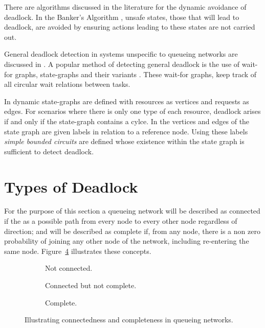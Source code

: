 \documentclass{article}
\begin{document}
There are algorithms discussed in the literature for the dynamic avoidance of deadlock.
In the Banker's Algorithm \cite{dijkstra82, kawadkaretal14}, unsafe states, those that will lead to deadlock, are avoided by ensuring actions leading to these states are not carried out.

General deadlock detection in systems unspecific to queueing networks are discussed in \cite{coffmanelphick71}.
A popular method of detecting general deadlock is the use of wait-for graphs, state-graphs and their variants \cite{cheng90, elmagarmid86, coffmanelphick71, choetal95}.
These wait-for graphs, keep track of all circular wait relations between tasks.

In \cite{coffmanelphick71} dynamic state-graphs are defined with resources as vertices and requests as edges.
For scenarios where there is only one type of each resource, deadlock arises if and only if the state-graph contains a cylce.
In \cite{choetal95} the vertices and edges of the state graph are given labels in relation to a reference node.
Using these labels \textit{simple bounded circuits} are defined whose existence within the state graph is sufficient to detect deadlock.

\section{Types of Deadlock}\label{sec:typesofdeadlock}
For the purpose of this section a queueing network will be described as connected if the as a possible path from every node to every other node regardless of direction; and will be described as complete if, from any node, there is a non zero probability of joining any other node of the network, including re-entering the same node.
Figure~\ref{fig:connectedcomplete} illustrates these concepts.

\begin{figure}[!htbp]
\begin{center}
\begin{subfigure}[b]{0.3\textwidth}
  
  \caption{Not connected.}
  \label{fig:connected}
\end{subfigure}
\begin{subfigure}[b]{0.3\textwidth}
  
  \caption{Connected but not complete.}
  \label{fig:notconnected}
\end{subfigure}
\begin{subfigure}[b]{0.3\textwidth}
  
  \caption{Complete.}
  \label{fig:complete}
\end{subfigure}
\end{center}
\caption{Illustrating connectedness and completeness in queueing networks.}
\label{fig:connectedcomplete}
\end{figure}
\end{document}

